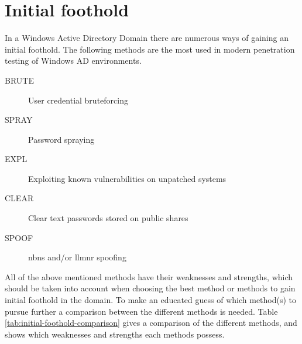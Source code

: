 \documentclass{article}
\begin{document}
\section{Initial foothold}
In a Windows Active Directory Domain there are numerous ways of gaining an initial foothold. The following methods are the most used in modern penetration testing of Windows AD environments.
\begin{description}
	\item[BRUTE] User credential bruteforcing
	\item[SPRAY] Password spraying
	\item[EXPL]Exploiting known vulnerabilities on unpatched systems
	\item[CLEAR] Clear text passwords stored on public shares
	\item[SPOOF] \gls{nbns} and/or \gls{llmnr} spoofing
\end{description}

All of the above mentioned methods have their weaknesses and strengths, which should be taken into account when choosing the best method or methods to gain initial foothold in the domain. To make an educated guess of which method(s) to pursue further a comparison between the different methods is needed. Table \ref{tab:initial-foothold-comparison} gives a comparison of the different methods, and shows which weaknesses and strengths each methods possess.
\end{document}
